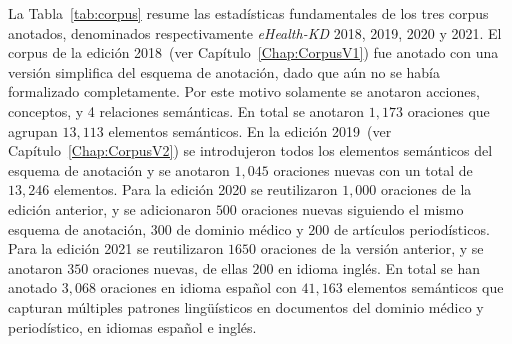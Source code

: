 La Tabla~\ref{tab:corpus} resume las estadísticas fundamentales de los tres corpus anotados, denominados
respectivamente \textit{eHealth-KD} 2018, 2019, 2020 y 2021.
El corpus de la edición 2018~(ver Capítulo~\ref{Chap:CorpusV1}) fue anotado con una versión simplifica del esquema de anotación, dado que aún no se había formalizado completamente. Por este motivo solamente se anotaron acciones, conceptos, y 4 relaciones semánticas. En total se anotaron $1,173$ oraciones que agrupan $13,113$ elementos semánticos.
En la edición 2019~(ver Capítulo~\ref{Chap:CorpusV2}) se introdujeron todos los elementos semánticos del esquema de anotación y se anotaron $1,045$ oraciones nuevas con un total de $13,246$ elementos.
Para la edición 2020 se reutilizaron $1,000$ oraciones de la edición anterior, y se adicionaron $500$ oraciones nuevas siguiendo el mismo esquema de anotación, $300$ de dominio médico y $200$ de artículos periodísticos.
Para la edición 2021 se reutilizaron $1650$ oraciones de la versión anterior, y se anotaron $350$ oraciones nuevas, de ellas $200$ en idioma inglés.
En total se han anotado $3,068$ oraciones en idioma español con $41,163$ elementos semánticos que capturan múltiples patrones lingüísticos en documentos del dominio médico y periodístico, en idiomas español e inglés.

